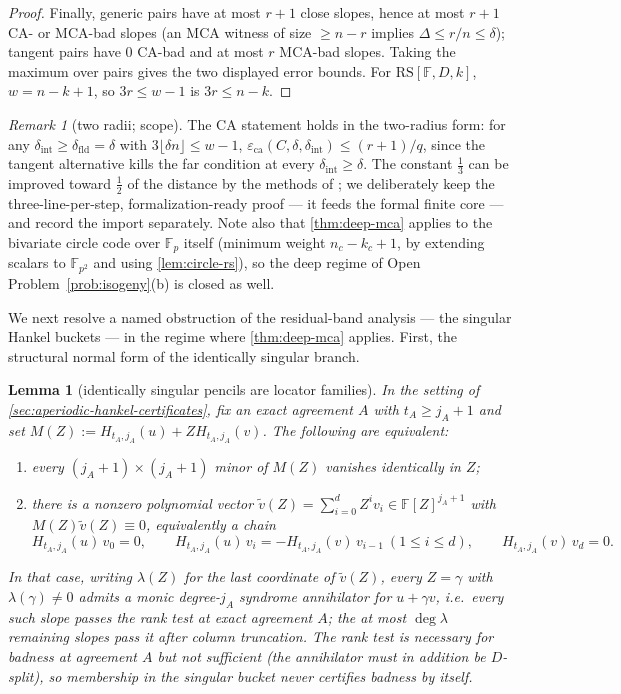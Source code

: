 \documentclass[11pt]{article}
\newtheorem{lemma}[theorem]{Lemma}
\theoremstyle{definition}
\theoremstyle{remark}
\newtheorem{remark}[theorem]{Remark}
\newcommand{\F}{\mathbb{F}}
\newcommand{\RS}{\mathrm{RS}}
\newcommand{\eca}{\varepsilon_{\mathrm{ca}}}
\newcommand{\dist}{\Delta}
\begin{document}
\begin{proof}
Finally, generic pairs have at most $r+1$ close slopes, hence at most $r+1$ CA- or MCA-bad slopes (an MCA witness of size $\ge n-r$ implies $\dist\le r/n\le\delta$); tangent pairs have $0$ CA-bad and at most $r$ MCA-bad slopes. Taking the maximum over pairs gives the two displayed error bounds. For $\RS[\F,D,k]$, $w=n-k+1$, so $3r\le w-1$ is $3r\le n-k$.
\end{proof}

\begin{remark}[two radii; scope]
The CA statement holds in the two-radius form: for any $\delta_{\mathrm{int}}\ge\delta_{\mathrm{fld}}=\delta$ with $3\lfloor\delta n\rfloor\le w-1$, $\eca(C,\delta,\delta_{\mathrm{int}})\le(r+1)/q$, since the tangent alternative kills the far condition at every $\delta_{\mathrm{int}}\ge\delta$. The constant $\frac13$ can be improved toward $\frac12$ of the distance by the methods of \cite{BCHKS25}; we deliberately keep the three-line-per-step, formalization-ready proof --- it feeds the formal finite core --- and record the import separately. Note also that \cref{thm:deep-mca} applies to the bivariate circle code over $\F_p$ itself \textup(minimum weight $n_c-k_c+1$, by extending scalars to $\F_{p^2}$ and using \cref{lem:circle-rs}\textup), so the deep regime of Open Problem~\ref{prob:isogeny}\textup{(b)} is closed as well.
\end{remark}

We next resolve a named obstruction of the residual-band analysis --- the singular Hankel buckets --- in the regime where \cref{thm:deep-mca} applies. First, the structural normal form of the identically singular branch.

\begin{lemma}[identically singular pencils are locator families]\label{lem:singular-pencil}
In the setting of \cref{sec:aperiodic-hankel-certificates}, fix an exact agreement $A$ with $t_A\ge j_A+1$ and set $M(Z):=H_{t_A,j_A}(u)+ZH_{t_A,j_A}(v)$. The following are equivalent:
\begin{enumerate}[label=\textup{(\roman*)}]
\item every $(j_A+1)\times(j_A+1)$ minor of $M(Z)$ vanishes identically in $Z$;
\item there is a nonzero polynomial vector $\widetilde v(Z)=\sum_{i=0}^{d}Z^iv_i\in\F[Z]^{j_A+1}$ with $M(Z)\widetilde v(Z)\equiv0$, equivalently a chain
\[
H_{t_A,j_A}(u)\,v_0=0,\qquad
H_{t_A,j_A}(u)\,v_{i}=-H_{t_A,j_A}(v)\,v_{i-1}\ (1\le i\le d),\qquad
H_{t_A,j_A}(v)\,v_d=0 .
\]
\end{enumerate}
In that case, writing $\lambda(Z)$ for the last coordinate of $\widetilde v(Z)$, every $Z=\gamma$ with $\lambda(\gamma)\ne0$ admits a monic degree-$j_A$ syndrome annihilator for $u+\gamma v$, i.e.\ every such slope passes the rank test at exact agreement $A$; the at most $\deg\lambda$ remaining slopes pass it after column truncation. The rank test is necessary for badness at agreement $A$ but not sufficient \textup(the annihilator must in addition be $D$-split\textup), so membership in the singular bucket never certifies badness by itself.
\end{lemma}
\end{document}

